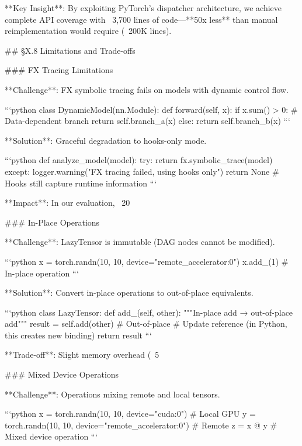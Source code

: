 **Key Insight**: By exploiting PyTorch's dispatcher architecture, we achieve complete API coverage with ~3,700 lines of code—**50x less** than manual reimplementation would require (~200K lines).

## §X.8 Limitations and Trade-offs

### FX Tracing Limitations

**Challenge**: FX symbolic tracing fails on models with dynamic control flow.

```python
class DynamicModel(nn.Module):
    def forward(self, x):
        if x.sum() > 0:  # Data-dependent branch
            return self.branch_a(x)
        else:
            return self.branch_b(x)
```

**Solution**: Graceful degradation to hooks-only mode.

```python
def analyze_model(model):
    try:
        return fx.symbolic_trace(model)
    except:
        logger.warning("FX tracing failed, using hooks only")
        return None  # Hooks still capture runtime information
```

**Impact**: In our evaluation, ~20%

### In-Place Operations

**Challenge**: LazyTensor is immutable (DAG nodes cannot be modified).

```python
x = torch.randn(10, 10, device="remote_accelerator:0")
x.add_(1)  # In-place operation
```

**Solution**: Convert in-place operations to out-of-place equivalents.

```python
class LazyTensor:
    def add_(self, other):
        """In-place add → out-of-place add"""
        result = self.add(other)  # Out-of-place
        # Update reference (in Python, this creates new binding)
        return result
```

**Trade-off**: Slight memory overhead (~5%

### Mixed Device Operations

**Challenge**: Operations mixing remote and local tensors.

```python
x = torch.randn(10, 10, device="cuda:0")      # Local GPU
y = torch.randn(10, 10, device="remote_accelerator:0")  # Remote
z = x @ y  # Mixed device operation
```

